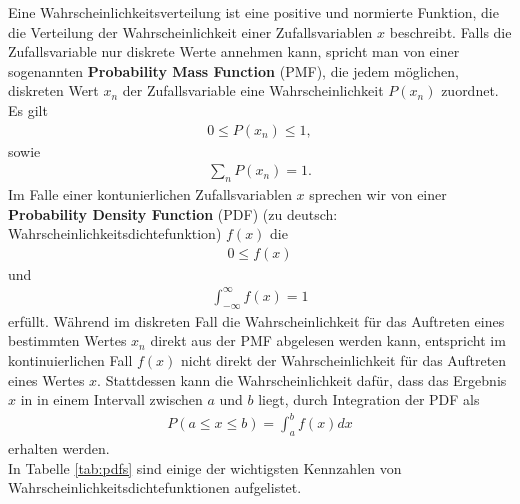Eine Wahrscheinlichkeitsverteilung ist eine positive und normierte Funktion, die die Verteilung der Wahrscheinlichkeit einer Zufallsvariablen $x$ beschreibt.  Falls die Zufallsvariable nur diskrete Werte annehmen kann, spricht man von einer sogenannten  \textbf{Probability Mass Function} (PMF), die jedem möglichen, diskreten Wert $x_n$ der Zufallsvariable eine Wahrscheinlichkeit $P(x_n)$ zuordnet. Es gilt 
\begin{align}
0 \leq P(x_n) \leq 1,
\end{align}
sowie
\begin{align}
\sum_n P(x_n) = 1.
\end{align}
Im Falle einer kontunierlichen Zufallsvariablen $x$ sprechen wir von einer  \textbf{Probability Density Function} (PDF) (zu deutsch: Wahrscheinlichkeitsdichtefunktion) $f(x)$ die
\begin{align}
0 \leq  f(x) 
\end{align}
und
\begin{align}
\int_{-\infty}^{\infty} f(x) = 1
\end{align}
erfüllt. Während im diskreten Fall die Wahrscheinlichkeit für das Auftreten eines bestimmten Wertes $x_n$ direkt aus der PMF abgelesen werden kann, entspricht im kontinuierlichen Fall $f(x)$ nicht direkt der Wahrscheinlichkeit für das Auftreten eines Wertes $x$. Stattdessen kann die Wahrscheinlichkeit dafür, dass das Ergebnis $x$ in in einem Intervall zwischen $a$ und $b$ liegt, durch Integration der PDF als  
\begin{align}
P(a\leq x \leq b) = \int_a^bf(x)dx
\end{align}
erhalten werden. \\

In Tabelle \ref{tab:pdfs} sind einige der wichtigsten Kennzahlen von Wahrscheinlichkeitsdichtefunktionen aufgelistet.

